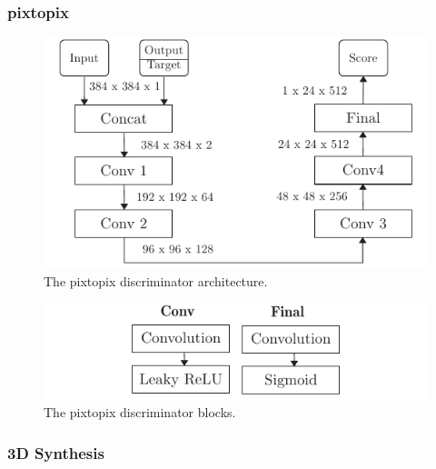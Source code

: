 \subsubsection{pixtopix}

\begin{figure}[h]
  \centering
  \includegraphics[width=\linewidth]{figure/pixtopix-disc.pdf}
  \caption{The pixtopix discriminator architecture.
	}\label{fig:pixtopix:disc}
\end{figure}
\begin{figure}[h]
  \centering
  \includegraphics[width=\linewidth]{figure/pixtopix-blocks.pdf}
  \caption{The pixtopix discriminator blocks.
	}\label{fig:pixtopix:blocks}
\end{figure}

\subsubsection{3D Synthesis}

